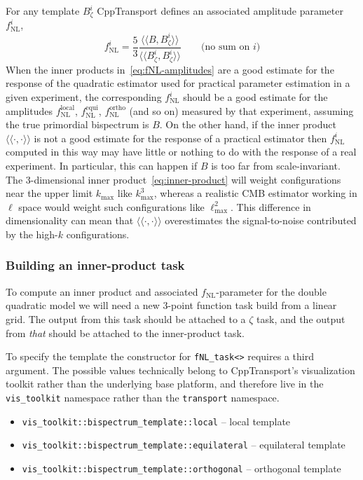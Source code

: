\documentclass[11pt,a4paper]{article}
\newcommand{\kmax}{k_\text{max}}
\newcommand{\ellmax}{\ell_\text{max}}
\newcommand{\Bzeta}{B_\zeta}
\newcommand{\fNL}{f_{\mathrm{NL}}}
\newcommand{\fNLlocal}{\fNL^{\text{local}}}
\newcommand{\fNLortho}{\fNL^{\text{ortho}}}
\newcommand{\fNLequi}{\fNL^{\text{equi}}}
\newcommand{\packagefont}{\sffamily}
\newcommand{\CppTransport}{{\packagefont CppTransport}}
\newcommand{\iprod}[2]{\langle\!\langle {#1}, {#2} \rangle\!\rangle}
\begin{document}
For any template $\Bzeta^i$
{\CppTransport} defines an associated amplitude parameter
$\fNL^i$,
\begin{equation}
    \fNL^i = \frac{5}{3} \frac{\iprod{B}{\Bzeta^i}}{\iprod{\Bzeta^i}{\Bzeta^i}}
    \qquad
    \text{(no sum on $i$)}
    \label{eq:fNL-amplitudes}
\end{equation}
When the inner products in~\eqref{eq:fNL-amplitudes}
are a good estimate for the response of
the quadratic estimator used for practical
parameter estimation in a given experiment, the
corresponding $\fNL^i$ should be a good estimate
for the amplitudes
$\fNLlocal$, $\fNLequi$, $\fNLortho$
(and so on)
measured by that experiment, assuming the
true primordial bispectrum is $B$.
On the other hand, if the inner product
$\iprod{\cdot}{\cdot}$ is not a good estimate
for the response of a practical estimator
then $\fNL^i$ computed in this way may have little or
nothing to do with the response of a real experiment.
In particular, this can happen if
$B$ is too far from scale-invariant.
The 3-dimensional inner product~\eqref{eq:inner-product}
will weight configurations near the upper limit
$\kmax$ like $\kmax^3$,
whereas a realistic CMB estimator working in $\ell$ space
would
weight such configurations like $\ellmax^2$.
This difference in dimensionality
can mean that
$\iprod{\cdot}{\cdot}$ overestimates the signal-to-noise
contributed by the high-$k$ configurations.

\subsubsection{Building an inner-product task}
To compute an inner product and associated $\fNL$-parameter
for the double quadratic model we will need a new
3-point function task build from a linear grid.
The output from this task should be attached to a
$\zeta$ task, and the output from \emph{that}
should be attached to the inner-product task.

To specify the template the constructor for
\texttt{fNL_task<>} requires a third
argument.
The possible values technically belong to
{\CppTransport}'s visualization toolkit rather
than the underlying base platform,
and therefore
live in the
\texttt{vis_toolkit} namespace rather than
the
\texttt{transport} namespace.
\begin{itemize}
    \item \texttt{vis_toolkit::bispectrum_template::local} -- local template
    \item \texttt{vis_toolkit::bispectrum_template::equilateral} -- equilateral template
    \item \texttt{vis_toolkit::bispectrum_template::orthogonal} -- orthogonal template
\end{itemize}
\end{document}

